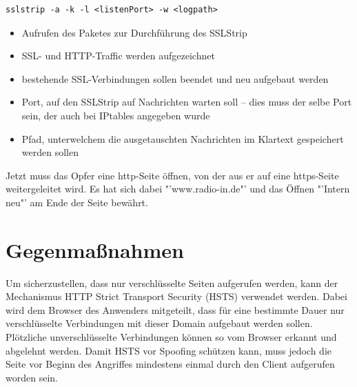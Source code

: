 \begin{lstlisting}
sslstrip -a -k -l <listenPort> -w <logpath>
\end{lstlisting}

\begin{itemize}
	\item {} Aufrufen des Paketes zur Durchführung des SSLStrip
	\item {} SSL- und HTTP-Traffic werden aufgezeichnet
	\item {} bestehende SSL-Verbindungen sollen beendet und neu aufgebaut werden
	\item {} Port, auf den SSLStrip auf Nachrichten warten soll -- dies muss der selbe Port sein, der auch bei IPtables angegeben wurde
	\item {} Pfad, unterwelchem die ausgetauschten Nachrichten im Klartext gespeichert werden sollen
\end{itemize}

Jetzt muss das Opfer eine http-Seite öffnen, von der aus er auf eine https-Seite weitergeleitet wird. Es hat sich dabei "'www.radio-in.de"' und das Öffnen "'Intern neu"' am Ende der Seite bewährt.

\section{Gegenmaßnahmen}

Um sicherzustellen, dass nur verschlüsselte Seiten aufgerufen werden, kann der Mechanismus HTTP Strict Transport Security (HSTS) verwendet werden. Dabei wird dem Browser des Anwenders mitgeteilt, dass für eine bestimmte Dauer nur verschlüsselte Verbindungen mit dieser Domain aufgebaut werden sollen. Plötzliche unverschlüsselte Verbindungen können so vom Browser erkannt und abgelehnt werden. Damit HSTS vor Spoofing schützen kann, muss jedoch die Seite vor Beginn des Angriffes mindestens einmal durch den Client aufgerufen worden sein.
